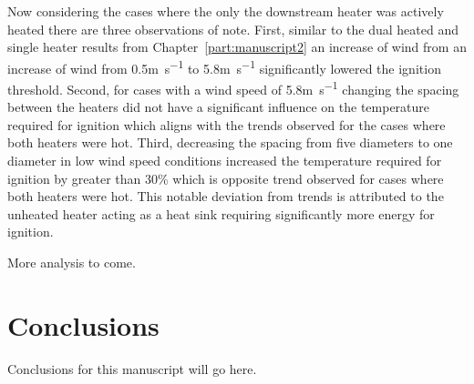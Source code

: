     Now considering the cases where the only the downstream heater was actively heated there are three observations of note. First, similar to the dual heated and single heater results from Chapter~\ref{part:manuscript2} an increase of wind from an increase of wind from 0.5\si{\meter\per\second} to 5.8\si{\meter\per\second} significantly lowered the ignition threshold. Second, for cases with a wind speed of 5.8\si{\meter\per\second} changing the spacing between the heaters did not have a significant influence on the temperature required for ignition which aligns with the trends observed for the cases where both heaters were hot. Third, decreasing the spacing from five diameters to one diameter in low wind speed conditions increased the temperature required for ignition by greater than 30\% which is opposite trend observed for cases where both heaters were hot. This notable deviation from trends is attributed to the unheated heater acting as a heat sink requiring significantly more energy for ignition. 
    
    More analysis to come. 
    
\section{Conclusions}
    Conclusions for this manuscript will go here. 
